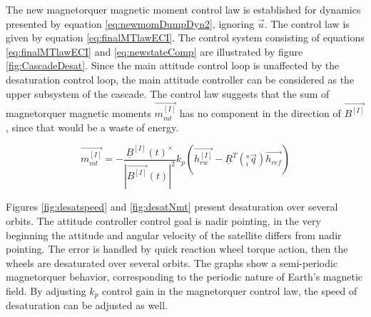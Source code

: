 The new magnetorquer magnetic moment control law is established for dynamics presented by equation \ref{eq:newmomDumpDyn2}, ignoring $\vec{u}$. The control law is given by equation \ref{eq:finalMTlawECI}. The control system consisting of equations \ref{eq:finalMTlawECI} and \ref{eq:newstateComp} are illustrated by figure \ref{fig:CascadeDesat}. Since the main attitude control loop is unaffected by the desaturation control loop, the main attitude controller can be considered as the upper subsystem of the cascade. The control law suggests that the sum of magnetorquer magnetic moments $\vec{m_{mt}^{[I]}} $ has no component in the direction of $\vec{B^{[I]}}$, since that would be a waste of energy.

\begin{equation}
\vec{m_{mt}^{[I]}} 
= - \frac{\underline{B}^{[I]}(t)^\times} {|\vec{B^{[I]}}(t) |^2} k_p\left(\vec{h_{rw}^{[I]}} - \underline{R}^T(^s_i\vec{ q})\vec{h_{ref}} \right)
\label{eq:finalMTlawECI}
\end{equation}


Figures \ref{fig:desatspeed} and \ref{fig:desatNmt} present desaturation over several orbits. The attitude controller control goal is nadir pointing, in the very beginning the attitude and angular velocity of the satellite differs from nadir pointing. The error is handled by quick reaction wheel torque action, then the wheels are desaturated over several orbits. The graphs show a semi-periodic magnetorquer behavior, corresponding to the periodic nature of Earth's magnetic field. By adjusting $k_p$ control gain in the magnetorquer control law, the speed of desaturation can be adjusted as well.




%
		
